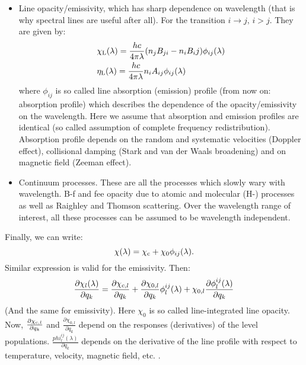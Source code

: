 \documentclass[referee]{aa}
\begin{document}
\begin{itemize}
 \item Line opacity/emissivity, which has sharp dependence on wavelength (that is why spectral lines are useful after all). For the transition $i\rightarrow j,\,i>j$. They are given by:
 \begin{align}
  &\chi_{\rm L}(\lambda) = \frac{hc}{4\pi\lambda} (n_j B_{ji}- n_i{B_ij}) \phi_{ij} (\lambda)\\
  &\eta_{\rm L}(\lambda) = \frac{hc}{4\pi\lambda} n_i A_{ij} \phi_{ij} (\lambda)
  \label{chieta}
 \end{align}
 where $\phi_{ij}$ is so called line absorption (emission) profile (from now on: absorption profile) which describes the dependence of the opacity/emissivity on the wavelength. Here we assume that absorption and emission profiles are identical (so called assumption of complete frequency redistribution). Absorption profile depends on the random and systematic velocities (Doppler effect), collisional damping (Stark and van der Waals broadening) and on magnetic field (Zeeman effect). 
 \item Continuum processes. These are all the processes which slowly wary with wavelength. B-f and fee opacity due to atomic and molecular (H-) processes as well as Raighley and Thomson scattering. Over the wavelength range of interest, all these processes can be assumed to be wavelength independent. 
\end{itemize}
Finally, we can write:
\begin{equation}
 \chi(\lambda) = \chi_{\rm c} + \chi_{0} \phi_{ij}(\lambda).
\end{equation}
Similar expression is valid for the emissivity. Then:
\begin{equation}
 \frac{\partial \chi_l(\lambda)}{\partial q_k} = \frac{\partial \chi_{{\rm c}, l}}{\partial q_k} + \frac{\partial \chi_{0,l}}{\partial q_k} \phi^{ij}_l (\lambda) + \chi_{0,l}\frac{\partial \phi^{ij}_l (\lambda)}{\partial q_k}
\end{equation}
(And the same for emissivity). Here $\chi_{0}$ is so called line-integrated line opacity. Now, $\frac{\partial \chi_{{\rm c}, l}}{\partial q_k}$ and $\frac{\partial \chi_{0,l}}{\partial q_k}$ depend on the responses (derivatives) of the level populations. $\frac{phi^{ij}_l (\lambda)}{\partial q_k}$ depends on the derivative of the line profile with respect to temperature, velocity, magnetic field, etc. \citep{SIR}.
\end{document}
